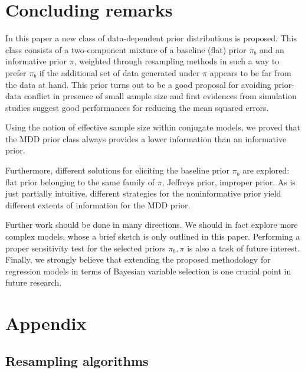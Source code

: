 \documentclass{statsoc}
\begin{document}
 
 
 


\section{Concluding remarks}
\label{sec:concl}

In this paper a new class of data-dependent prior distributions is proposed. This class consists of a two-component mixture of a baseline (flat) prior $\pi_{b}$ and an informative prior $\pi$, weighted through resampling methods in such a way to prefer $\pi_{b}$ if the additional set of data generated under $\pi$ appears to be far from the data at hand. This prior turns out to be a good proposal for avoiding prior-data conflict in presence of small sample size and first evidences from simulation studies suggest good performances for reducing the mean squared errors. 
 
Using the notion of effective sample size within conjugate models, we proved that the MDD prior class always provides a lower information than an informative prior.

Furthermore, different solutions for eliciting the baseline prior $\pi_{b}$ are explored: flat prior belonging to the same family of $\pi$, Jeffreys prior, improper prior. As is just partially intuitive, different strategies for the noninformative prior yield different extents of information for the MDD prior. 

Further work should be done in many directions. We should in fact explore more complex models, whose a brief sketch is only outlined in this paper.  Performing a proper sensitivity test for the selected priors $\pi_{b}, \pi$ is also a task of future interest. Finally, we strongly believe that extending the proposed methodology for regression models in terms of Bayesian variable selection is one crucial point in future research.

  




\section*{Appendix}

\subsection*{Resampling algorithms}
\end{document}
